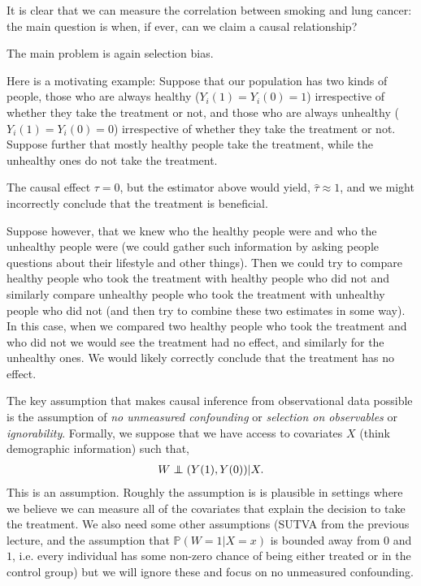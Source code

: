 \documentclass[twoside,12pt]{article}
\begin{document}
It is clear that we can measure the correlation between smoking and lung cancer: the main question is when, if ever, can we claim a causal relationship?

The main problem is again selection bias. 

Here is a motivating example: Suppose that our population has two kinds of people, those who are always healthy ($Y_i(1) = Y_i(0) = 1$) irrespective of whether they take the treatment or not, and those who are always unhealthy ($Y_i(1) = Y_i(0) = 0$) irrespective of whether they take the treatment or not. Suppose further that mostly healthy people take the treatment, while the unhealthy ones do not take the treatment.

The causal effect $\tau = 0$, but the estimator above would yield, $\widehat{\tau} \approx 1$, and we might incorrectly conclude that the treatment is beneficial.

Suppose however, that we knew who the healthy people were and who the unhealthy people were (we could gather such information by asking people questions about their lifestyle and other things). Then we could try to compare healthy people who took the treatment with healthy people who did not and similarly compare unhealthy people who took the treatment with unhealthy people who did not (and then try to combine these two estimates in some way). In this case, when we compared two healthy people who took the treatment and who did not we would see the treatment had no effect, and similarly for the unhealthy ones. We would likely correctly conclude that the treatment has no effect.


The key assumption that makes causal inference from observational data possible is the assumption of \emph{no unmeasured confounding} or \emph{selection on observables} or \emph{ignorability}. Formally, we suppose that we have access to covariates $X$ (think demographic information) such that,
\begin{align*}
W \independent (Y(1),Y(0)) | X.
\end{align*}
This is an assumption. Roughly the assumption is is plausible in settings where we believe we can measure all of the covariates that explain the decision to take the treatment. We also need some other assumptions (SUTVA from the previous lecture, and the assumption that $\mathbb{P}(W = 1| X = x)$ is bounded away from $0$ and $1$, i.e. every individual has some non-zero chance of being either treated or in the control group) but we will ignore these and focus on no unmeasured confounding.
\end{document}
